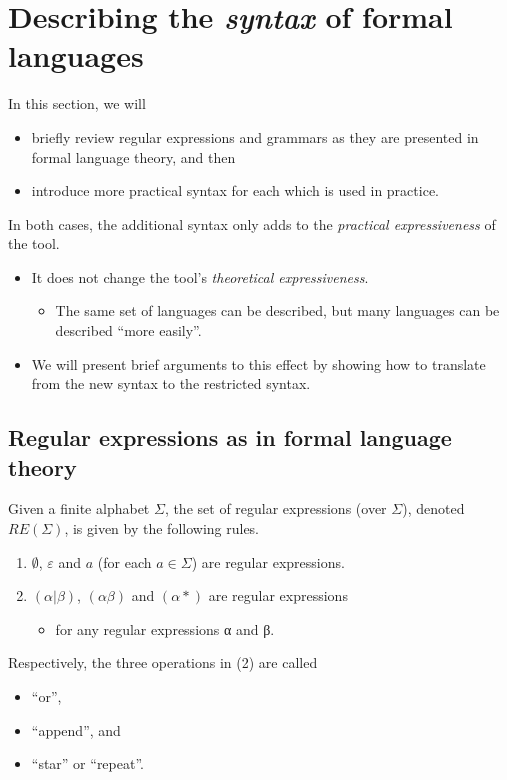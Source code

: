 \documentclass[11pt]{article}
\theoremstyle{definition}
\begin{document}
\section{Describing the \emph{syntax} of formal languages}
\label{sec:org6d0305c}

In this section, we will
\begin{itemize}
\item briefly review regular expressions and grammars as
they are presented in formal language theory, and then
\item introduce more practical syntax for each
which is used in practice.
\end{itemize}

In both cases, the additional syntax only adds to
the \emph{practical expressiveness} of the tool.
\begin{itemize}
\item It does not change the tool's \emph{theoretical expressiveness}.
\begin{itemize}
\item The same set of languages can be described,
but many languages can be described “more easily”.
\end{itemize}
\item We will present brief arguments to this effect
by showing how to translate from the new syntax
to the restricted syntax.
\end{itemize}

\subsection{Regular expressions as in formal language theory}
\label{sec:orgfca3e6f}

Given a finite alphabet \(Σ\),
the set of regular expressions (over \(Σ\)),
denoted \(RE(Σ)\), is given
by the following rules.
\begin{enumerate}
\item \(∅\), \(ε\) and \(a\) (for each \(a ∈ Σ\)) are regular expressions.
\item \((α | β)\), \((αβ)\) and \((α*)\) are regular expressions
\begin{itemize}
\item for any regular expressions α and β.
\end{itemize}
\end{enumerate}

Respectively, the three operations in (2) are called
\begin{itemize}
\item “or”,
\item “append”, and
\item “star” or “repeat”.
\end{itemize}
\end{document}
